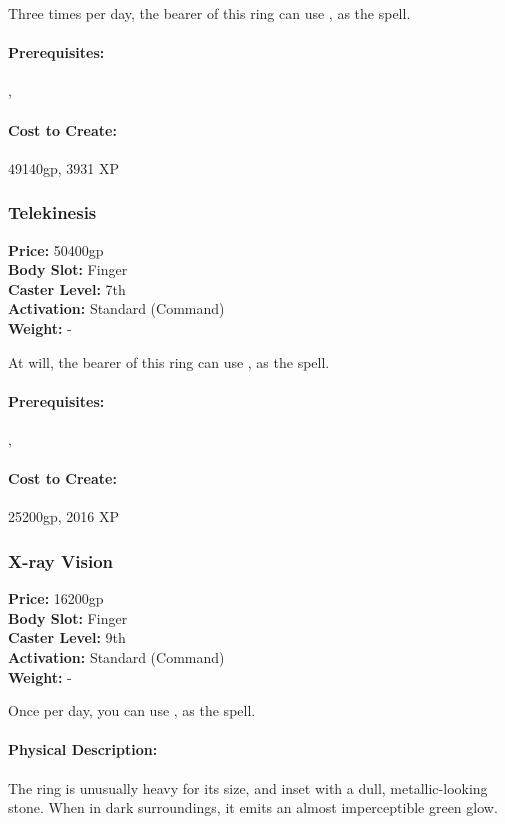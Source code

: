 Three times per day, the bearer of this ring can use , as the spell.

\paragraph{Prerequisites:} , 

\paragraph{Cost to Create:} 49140gp, 3931 XP
\subsubsection{Telekinesis}
\label{Item:Telekinesis}
   \textbf{Price:} 50400gp
\\ \textbf{Body Slot:} Finger
\\ \textbf{Caster Level:} 7th
\\ \textbf{Activation:} Standard (Command)
\\ \textbf{Weight:} -

At will, the bearer of this ring can use , as the spell.

\paragraph{Prerequisites:} , 

\paragraph{Cost to Create:} 25200gp, 2016 XP
\subsubsection{X-ray Vision}
\label{Item:XRayVision}
   \textbf{Price:} 16200gp
\\ \textbf{Body Slot:} Finger
\\ \textbf{Caster Level:} 9th
\\ \textbf{Activation:} Standard (Command)
\\ \textbf{Weight:} -

Once per day, you can use , as the spell.

\paragraph{Physical Description:} The ring is unusually heavy for its size, and inset with a dull, metallic-looking stone. When in dark surroundings, it emits an almost imperceptible green glow.

